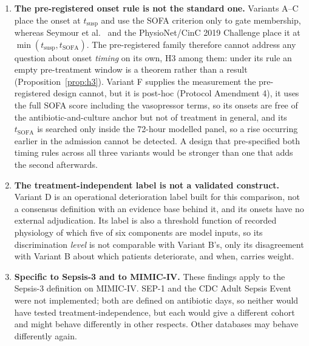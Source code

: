 \begin{enumerate}
    \item \textbf{The pre-registered onset rule is not the standard one.}
    Variants A--C place the onset at $t_{\text{susp}}$ and use the SOFA
    criterion only to gate membership, whereas Seymour et al.\
    \cite{seymour2016assessment} and the PhysioNet/CinC 2019 Challenge
    \cite{reyna2020utility} place it at
    $\min(t_{\text{susp}}, t_{\text{SOFA}})$. The pre-registered family
    therefore cannot address any question about onset \emph{timing} on its own,
    H3 among them: under its rule an empty pre-treatment window is a theorem
    rather than a result (Proposition~\ref{prop:h3}). Variant F supplies the
    measurement the pre-registered design cannot, but it is post-hoc (Protocol
    Amendment 4), it uses the full SOFA score including the vasopressor terms, so its onsets are free of the antibiotic-and-culture anchor but not of
    treatment in general, and its $t_{\text{SOFA}}$ is searched only inside
    the 72-hour modelled panel, so a rise occurring earlier in the admission
    cannot be detected. A design that pre-specified both timing rules across all
    three variants would be stronger than one that adds the second afterwards.

    \item \textbf{The treatment-independent label is not a validated construct.}
    Variant D is an operational deterioration label built for this comparison,
    not a consensus definition with an evidence base behind it, and its onsets
    have no external adjudication. Its label is also a threshold function of
    recorded physiology of which five of six components are model inputs, so
    its discrimination \emph{level} is not comparable with Variant B's, only
    its disagreement with Variant B about which patients deteriorate, and when,
    carries weight.

    \item \textbf{Specific to Sepsis-3 and to MIMIC-IV.} These findings apply
    to the Sepsis-3 definition on MIMIC-IV. SEP-1 and the CDC Adult Sepsis Event
    were not implemented; both are defined on antibiotic days, so neither would
    have tested treatment-independence, but each would give a different cohort
    and might behave differently in other respects. Other databases may behave
    differently again.


\end{enumerate}
